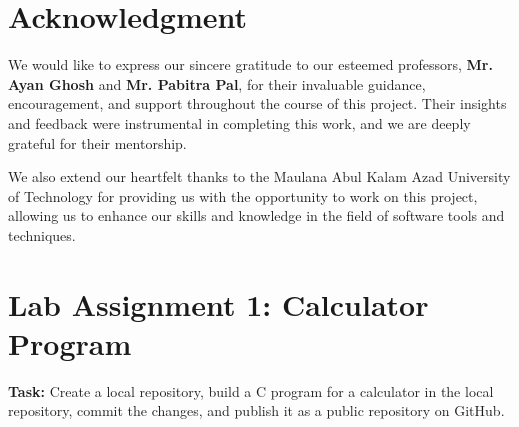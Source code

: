 \documentclass[a4paper,12pt]{report}
\begin{document}
\section*{Acknowledgment}

We would like to express our sincere gratitude to our esteemed professors, \textbf{Mr. Ayan Ghosh} and \textbf{Mr. Pabitra Pal}, for their invaluable guidance, encouragement, and support throughout the course of this project. Their insights and feedback were instrumental in completing this work, and we are deeply grateful for their mentorship.

We also extend our heartfelt thanks to the Maulana Abul Kalam Azad University of Technology for providing us with the opportunity to work on this project, allowing us to enhance our skills and knowledge in the field of software tools and techniques.

\vspace{1in}

\noindent\makebox[0.5\textwidth]{\hrulefill} \hfill \makebox[0.5\textwidth]{\hrulefill}

\noindent{} \hfill {}


\newpage %
\tableofcontents %

\newpage %

\section{Lab Assignment 1: Calculator Program}

\textbf{Task:} Create a local repository, build a C program for a calculator in the local repository, commit the changes, and publish it as a public repository on GitHub.
\end{document}
